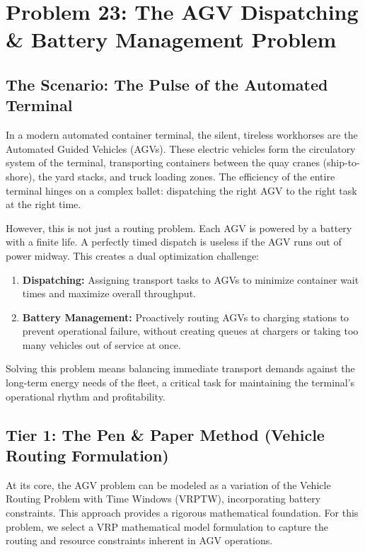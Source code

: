 \documentclass{article}
\begin{document}
\section*{Problem 23: The AGV Dispatching \& Battery Management Problem}

\subsection*{The Scenario: The Pulse of the Automated Terminal}
In a modern automated container terminal, the silent, tireless workhorses are the Automated Guided Vehicles (AGVs). These electric vehicles form the circulatory system of the terminal, transporting containers between the quay cranes (ship-to-shore), the yard stacks, and truck loading zones. The efficiency of the entire terminal hinges on a complex ballet: dispatching the right AGV to the right task at the right time.

However, this is not just a routing problem. Each AGV is powered by a battery with a finite life. A perfectly timed dispatch is useless if the AGV runs out of power midway. This creates a dual optimization challenge:
\begin{enumerate}
    \item \textbf{Dispatching:} Assigning transport tasks to AGVs to minimize container wait times and maximize overall throughput.
    \item \textbf{Battery Management:} Proactively routing AGVs to charging stations to prevent operational failure, without creating queues at chargers or taking too many vehicles out of service at once.
\end{enumerate}
Solving this problem means balancing immediate transport demands against the long-term energy needs of the fleet, a critical task for maintaining the terminal's operational rhythm and profitability.

\subsection*{Tier 1: The Pen \& Paper Method (Vehicle Routing Formulation)}
At its core, the AGV problem can be modeled as a variation of the Vehicle Routing Problem with Time Windows (VRPTW), incorporating battery constraints. This approach provides a rigorous mathematical foundation. For this problem, we select a VRP mathematical model formulation to capture the routing and resource constraints inherent in AGV operations.
\end{document}
